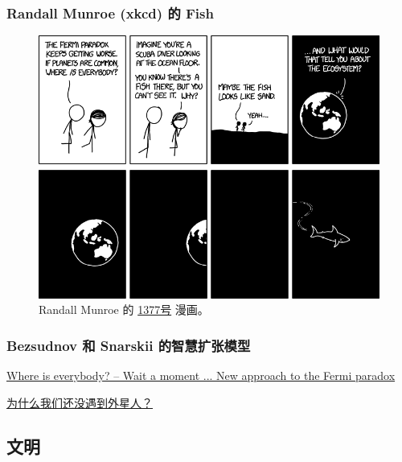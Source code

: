 \documentclass[letterpaper,10pt,english]{sphinxmanual}
\begin{document}
\subsubsection{Randall Munroe (xkcd) 的 Fish}
\label{fermi:randall-munroe-xkcd-fish}\begin{figure}[htbp]
\centering
\capstart

\includegraphics{fish.png}
\caption{Randall Munroe 的 \href{http://xkcd.com/1377/}{1377号} 漫画。}\end{figure}


\subsubsection{Bezsudnov 和 Snarskii 的智慧扩张模型}
\label{fermi:bezsudnov-snarskii}
\href{http://arxiv.org/abs/1007.2774}{Where is everybody? -- Wait a moment ... New approach to the Fermi paradox}

\href{http://www.guokr.com/article/129942/}{为什么我们还没遇到外星人？}


\subsection{文明}
\label{fermi:id8}
\end{document}
